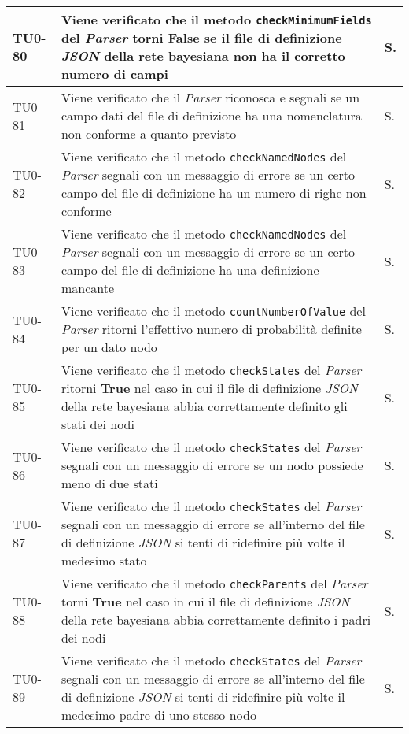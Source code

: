 \begin{longtable}{|C{.15\textwidth}|m{.66\textwidth}|C{.10\textwidth}|}
\hline
TU0-80 & Viene verificato che il metodo \texttt{checkMinimumFields} del \textit{Parser} torni \textbf{False} se il file di definizione \textit{JSON} della rete bayesiana non ha il corretto numero di campi & S.\\
\hline
{}TU0-81 & Viene verificato che il \textit{Parser} riconosca e segnali se un campo dati del file di definizione ha una nomenclatura non conforme a quanto previsto & S.\\
\hline
TU0-82 & Viene verificato che il metodo \texttt{checkNamedNodes} del \textit{Parser} segnali con un messaggio di errore se un certo campo del file di definizione ha un numero di righe non conforme & S.\\
\hline
{}TU0-83 & Viene verificato che il metodo \texttt{checkNamedNodes} del \textit{Parser} segnali con un messaggio di errore se un certo campo del file di definizione ha una definizione mancante & S.\\
\hline
TU0-84 & Viene verificato che il metodo \texttt{countNumberOfValue} del \textit{Parser} ritorni l'effettivo numero di probabilità definite per un dato nodo & S.\\
\hline
{}TU0-85 & Viene verificato che il metodo \texttt{checkStates} del \textit{Parser} ritorni \textbf{True} nel caso in cui il file di definizione \textit{JSON} della rete bayesiana abbia correttamente definito gli stati dei nodi & S.\\
\hline
TU0-86 & Viene verificato che il metodo \texttt{checkStates} del \textit{Parser} segnali con un messaggio di errore se un nodo possiede meno di due stati & S.\\
\hline
{}TU0-87 & Viene verificato che il metodo \texttt{checkStates} del \textit{Parser} segnali con un messaggio di errore se all'interno del file di definizione \textit{JSON} si tenti di ridefinire più volte il medesimo stato & S.\\
\hline
TU0-88 & Viene verificato che il metodo \texttt{checkParents} del \textit{Parser} torni \textbf{True} nel caso in cui il file di definizione \textit{JSON} della rete bayesiana abbia correttamente definito i padri dei nodi & S.\\
\hline
{}TU0-89 & Viene verificato che il metodo \texttt{checkStates} del \textit{Parser} segnali con un messaggio di errore se all'interno del file di definizione \textit{JSON} si tenti di ridefinire più volte il medesimo padre di uno stesso nodo & S.\\
\hline

\end{longtable}
